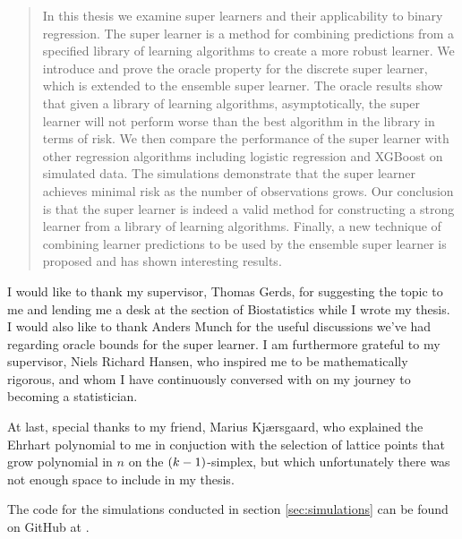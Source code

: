 \vspace{\fill}
\begin{abstract}
In this thesis we examine super learners and their applicability to binary regression. The super learner is a method for combining predictions from a specified library of learning algorithms to create a more robust learner. We introduce and prove the oracle property for the discrete super learner, which is extended to the ensemble super learner. The oracle results show that given a library of learning algorithms, asymptotically, the super learner will not perform worse than the best algorithm in the library in terms of risk. We then compare the performance of the super learner with other regression algorithms including logistic regression and XGBoost on simulated data. The simulations demonstrate that the super learner achieves minimal risk as the number of observations grows. Our conclusion is that the super learner is indeed a valid method for constructing a strong learner from a library of learning algorithms. Finally, a new technique of combining learner predictions to be used by the ensemble super learner is proposed and has shown interesting results. 
\end{abstract}
\vspace{\fill}
\begin{acknowledgements}
   I would like to thank my supervisor, Thomas Gerds, for suggesting the topic to me and lending me a desk at the section of Biostatistics while I wrote my thesis. I would also like to thank Anders Munch for the useful discussions we've had regarding oracle bounds for the super learner. I am furthermore grateful to my supervisor, Niels Richard Hansen, who inspired me to be mathematically rigorous, and whom I have continuously conversed with on my journey to becoming a statistician.

   At last, special thanks to my friend, Marius Kjærsgaard, who explained the Ehrhart polynomial to me in conjuction with the selection of lattice points that grow polynomial in $ n $ on the $ (k-1) $-simplex, but which unfortunately there was not enough space to include in my thesis. 
\end{acknowledgements}
\vspace{\fill}
\begin{codeavailability}
    The code for the simulations conducted in section \ref{sec:simulations} can be found on GitHub at \parencite{github}.
\end{codeavailability}
\vspace{\fill}

